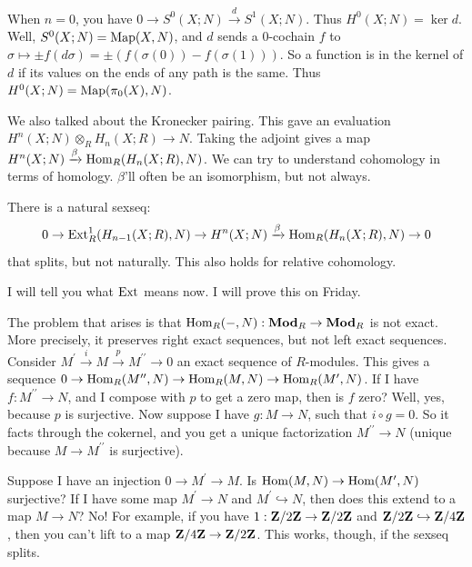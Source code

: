 When $n=0$, you have $0\to S^0(X;N)\xrightarrow{d} S^1(X;N)$. Thus $ H^0(X;N)=\ker d$. Well, $S^0(X;N)=\operatorname{Map}(X,N)$, and $d$ sends a $0$-cochain $f$ to $\sigma\mapsto\pm f(d\sigma)=\pm(f(\sigma(0))-f(\sigma(1)))$. So a function is in the kernel of $d$ if its values on the ends of any path is the same. Thus $ H^0(X;N)=\operatorname{Map}(\pi_0(X),N)$.

We also talked about the Kronecker pairing. This gave an evaluation $ H^n(X;N)\otimes_R H_n(X;R)\to N$. Taking the adjoint gives a map $ H^n(X;N)\xrightarrow{\beta}\operatorname{Hom}_R( H_n(X;R),N)$. We can try to understand cohomology in terms of homology. $\beta$'ll often be an isomorphism, but not always.
\begin{theorem}
There is a natural sexseq:
\begin{equation*}
0\to\operatorname{Ext}^1_R( H_{n-1}(X;R),N)\to H^n(X;N)\xrightarrow{\beta}\operatorname{Hom}_R( H_n(X;R),N)\to 0
\end{equation*}
that splits, but not naturally. This also holds for relative cohomology.
\end{theorem}
I will tell you what $\operatorname{Ext}$ means now. I will prove this on Friday.

The problem that arises is that $\operatorname{Hom}_R(-,N):\mathbf{Mod}_R\to\mathbf{Mod}_R$ is not exact. More precisely, it preserves right exact sequences, but not left exact sequences. Consider $M^\prime\xrightarrow{i} M\xrightarrow{p} M^{\prime\prime}\to 0$ an exact sequence of $R$-modules. This gives a sequence $0\to \operatorname{Hom}_R(M^{\prime\prime},N)\to\operatorname{Hom}_R(M,N)\to \operatorname{Hom}_R(M^{\prime},N)$. If I have $f:M^{\prime\prime}\to N$, and I compose with $p$ to get a zero map, then is $f$ zero? Well, yes, because $p$ is surjective. Now suppose I have $g:M\to N$, such that $i\circ g=0$. So it facts through the cokernel, and you get a unique factorization $M^{\prime\prime}\to N$ (unique because $M\to M^{\prime\prime}$ is surjective).

Suppose I have an injection $0\to M^\prime\to M$. Is $\operatorname{Hom}(M,N)\to\operatorname{Hom}(M^\prime,N)$ surjective? If I have some map $M^\prime\to N$ and $M^\prime\hookrightarrow N$, then does this extend to a map $M\to N$? No! For example, if you have $1:\mathbf Z/2\mathbf Z\to\mathbf Z/2\mathbf Z$ and $\mathbf Z/2\mathbf Z\hookrightarrow\mathbf Z/4\mathbf Z$, then you can't lift to a map $\mathbf Z/4\mathbf Z\to\mathbf Z/2\mathbf Z$. This works, though, if the sexseq splits.

